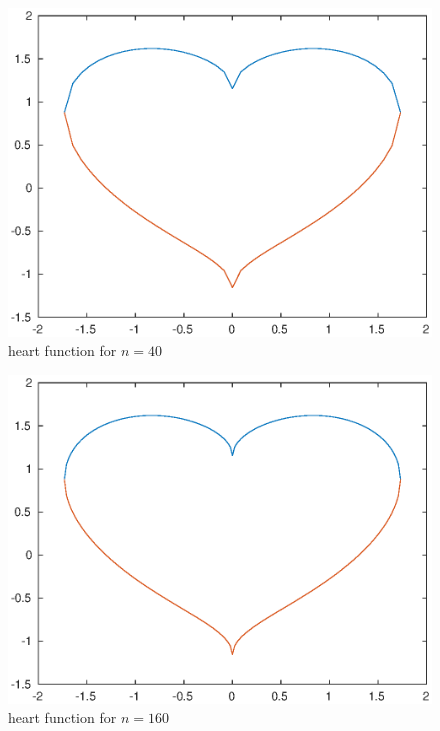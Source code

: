 \documentclass[twoside,a4paper]{article}
\begin{document}
\begin{figure}[h]
\includegraphics[width=6in]{./figure/n40.eps}
\caption{heart function for $n=40$}
\end{figure}

\begin{figure}[h]
\includegraphics[width=6in]{./figure/n160.eps}
\caption{heart function for $n=160$}
\end{figure}
\end{document}
